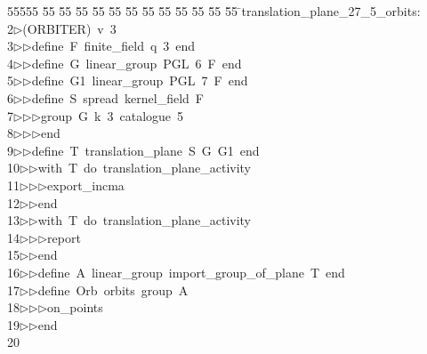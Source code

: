 %
%
\begin{tabbing}
55555 \= 55 \= 55 \= 55 \= 55 \= 55 \= 55 \= 55 \= 55 \= 55 \= 55 \= 55 \= 55 \= \>translation\_plane\_27\_5\_orbits:\\[0pt]
2\>$\triangleright$\>(ORBITER)\ v\ 3\ \\[0pt]
3\>$\triangleright$\>$\triangleright$\>define\ F\ finite\_field\ q\ 3\ end\ \\[0pt]
4\>$\triangleright$\>$\triangleright$\>define\ G\ linear\_group\ PGL\ 6\ F\ end\ \\[0pt]
5\>$\triangleright$\>$\triangleright$\>define\ G1\ linear\_group\ PGL\ 7\ F\ end\ \\[0pt]
6\>$\triangleright$\>$\triangleright$\>define\ S\ spread\ kernel\_field\ F\ \\[0pt]
7\>$\triangleright$\>$\triangleright$\>$\triangleright$\>group\ G\ k\ 3\ catalogue\ 5\ \\[0pt]
8\>$\triangleright$\>$\triangleright$\>$\triangleright$\>end\ \\[0pt]
9\>$\triangleright$\>$\triangleright$\>define\ T\ translation\_plane\ S\ G\ G1\ end\ \\[0pt]
10\>$\triangleright$\>$\triangleright$\>with\ T\ do\ translation\_plane\_activity\ \\[0pt]
11\>$\triangleright$\>$\triangleright$\>$\triangleright$\>export\_incma\ \\[0pt]
12\>$\triangleright$\>$\triangleright$\>end\ \\[0pt]
13\>$\triangleright$\>$\triangleright$\>with\ T\ do\ translation\_plane\_activity\ \\[0pt]
14\>$\triangleright$\>$\triangleright$\>$\triangleright$\>report\ \\[0pt]
15\>$\triangleright$\>$\triangleright$\>end\ \\[0pt]
16\>$\triangleright$\>$\triangleright$\>define\ A\ linear\_group\ import\_group\_of\_plane\ T\ end\ \\[0pt]
17\>$\triangleright$\>$\triangleright$\>define\ Orb\ orbits\ group\ A\ \\[0pt]
18\>$\triangleright$\>$\triangleright$\>$\triangleright$\>on\_points\ \\[0pt]
19\>$\triangleright$\>$\triangleright$\>end\\[0pt]
20\>\end{tabbing}
